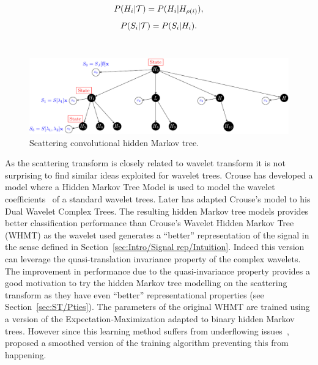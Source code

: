 \documentclass[a4paper,11pt]{report}
\begin{document}
    \begin{equation}
      P(H_{i} |\mathcal{T}) = P(H_{i} | H_{\rho(i)}),
      \label{eq:SCHMT - hypo 1}
    \end{equation}    
    \begin{equation}
      P(S_{i} |\mathcal{T}) = P(S_{i} | H_{i}).
      \label{eq:SCHMT - hypo 2}
    \end{equation} \\
    
		\begin{figure}[h]
				\begin{center}
					\includegraphics[width=5in]{scat_HMT_crop.pdf}
					\caption{Scattering convolutional hidden Markov tree.}
					\label{fig:SCHMT 1}
				\end{center}
		\end{figure}
		
		As the scattering transform is closely related to wavelet transform it is not surprising to find similar ideas exploited for wavelet trees. Crouse has developed a model where a Hidden Markov Tree Model is used to model the wavelet coefficients~\citep{crouse1998wavelet} of a standard wavelet trees. Later \citet{kingsbury2001complex} has  adapted Crouse's model to his Dual Wavelet Complex Trees. The resulting hidden Markov tree models provides better classification performance than Crouse's Wavelet Hidden Markov Tree (WHMT) as the wavelet used generates a ``better'' representation of the signal in the sense defined in Section~\ref{sec:Intro/Signal rep/Intuition}. Indeed this version can leverage the quasi-translation invariance property of the complex wavelets. The improvement in performance due to the quasi-invariance property provides a good motivation to try the hidden Markov tree modelling on the scattering transform as they have even ``better'' representational properties (see Section~\ref{sec:ST/Pties}). The parameters of the original WHMT are trained using a version of the Expectation-Maximization adapted to binary hidden Markov trees. However since this learning method suffers from underflowing issues~\citep{devijver1985baum}, \citet{durand2004computational} proposed a smoothed version of the training algorithm preventing this from happening.\\
     
\end{document}
